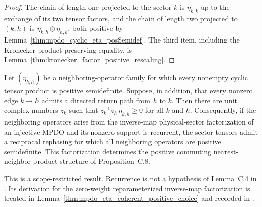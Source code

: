 \begin{proof}
    \leanok
    The chain of length one projected to the sector $k$ is $\eta_{k,k}$ up
    to the exchange of its two tensor factors, and the chain of length two
    projected to $(k,h)$ is $\eta_{k,h}\otimes\eta_{h,k}$, both positive by
    Lemma~\ref{thm:mpdo_cyclic_eta_posSemidef}. The third item, including
    the Kronecker-product-preserving equality, is
    Lemma~\ref{thm:kronecker_factor_positive_rescaling}.
\end{proof}

\begin{lemma}%
    \label{thm:mpdo_eta_coherent_positive_choice_recurrent}
    \leanok
    Let $(\eta_{k,h})$ be a neighboring-operator family for which every
    nonempty cyclic tensor product is positive semidefinite. Suppose, in
    addition, that every nonzero edge $k\to h$ admits a directed return path
    from $h$ to $k$. Then there are unit complex numbers $z_k$ such that
    $z_k^{-1}z_h\,\eta_{k,h}\geq0$ for all $k$ and $h$.
    Consequently, if the neighboring operators arise from the inverse-map
    physical-sector factorization of an injective MPDO and its nonzero
    support is recurrent, the sector tensors admit a reciprocal rephasing
    for which all neighboring operators are positive semidefinite. This
    factorization determines the positive commuting nearest-neighbor product
    structure of Proposition~C.8.

    This is a scope-restricted result. Recurrence is not a hypothesis of
    Lemma~C.4 in
    \cite[Appendix~C.2, lines~1406--1450]{Cirac2016MPDO_arXiv}. Its derivation
    for the zero-weight reparameterized inverse-map factorization is treated in
    Lemma~\ref{thm:mpdo_eta_coherent_positive_choice} and recorded in
    \cite{gap:cpgsv17_mpdo_sal_zcl_eta_local_structure}.
\end{lemma}

